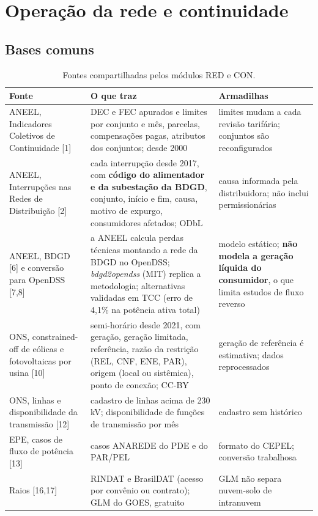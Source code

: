 
\section{Operação da rede e continuidade}

\subsection*{Bases comuns}

\begin{table}[H]
\centering\small
\caption{Fontes compartilhadas pelos módulos RED e CON.}
\begin{tabularx}{\textwidth}{P{3.6cm} L P{3.6cm}}
\toprule
\textbf{Fonte} & \textbf{O que traz} & \textbf{Armadilhas} \\
\midrule
ANEEL, Indicadores Coletivos de Continuidade [1] & DEC e FEC apurados e limites por conjunto e mês, parcelas, compensações pagas, atributos dos conjuntos; desde 2000 & limites mudam a cada revisão tarifária; conjuntos são reconfigurados \\
ANEEL, Interrupções nas Redes de Distribuição [2] & cada interrupção desde 2017, com \textbf{código do alimentador e da subestação da BDGD}, conjunto, início e fim, causa, motivo de expurgo, consumidores afetados; ODbL & causa informada pela distribuidora; não inclui permissionárias \\
ANEEL, BDGD [6] e conversão para OpenDSS [7,8] & a ANEEL calcula perdas técnicas montando a rede da BDGD no OpenDSS; \emph{bdgd2opendss} (MIT) replica a metodologia; alternativas validadas em TCC (erro de 4,1\% na potência ativa total) & modelo estático; \textbf{não modela a geração líquida do consumidor}, o que limita estudos de fluxo reverso \\
ONS, constrained-off de eólicas e fotovoltaicas por usina [10] & semi-horário desde 2021, com geração, geração limitada, referência, razão da restrição (REL, CNF, ENE, PAR), origem (local ou sistêmica), ponto de conexão; CC-BY & geração de referência é estimativa; dados reprocessados \\
ONS, linhas e disponibilidade da transmissão [12] & cadastro de linhas acima de 230 kV; disponibilidade de funções de transmissão por mês & cadastro sem histórico \\
EPE, casos de fluxo de potência [13] & casos ANAREDE do PDE e do PAR/PEL & formato do CEPEL; conversão trabalhosa \\
Raios [16,17] & RINDAT e BrasilDAT (acesso por convênio ou contrato); GLM do GOES, gratuito & GLM não separa nuvem-solo de intranuvem \\
\bottomrule
\end{tabularx}
\end{table}

